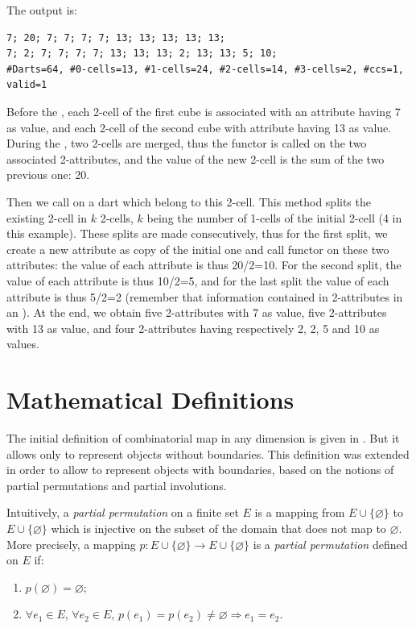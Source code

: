 The output is:
\begin{verbatim}
7; 20; 7; 7; 7; 7; 13; 13; 13; 13; 13; 
7; 2; 7; 7; 7; 7; 13; 13; 13; 2; 13; 13; 5; 10; 
#Darts=64, #0-cells=13, #1-cells=24, #2-cells=14, #3-cells=2, #ccs=1, valid=1
\end{verbatim}

Before the , each 2-cell of the first cube is
associated with an attribute having 7 as value, and each 2-cell of the
second cube with attribute having 13 as value. During the
, two 2-cells are merged, thus the functor
 is called on the two associated 2-attributes, and
the value of the new 2-cell is the sum of the two previous one: 20.

Then we call  on a dart which
belong to this 2-cell. This method splits the existing 2-cell in $k$
2-cells, $k$ being the number of 1-cells of the initial 2-cell (4 in
this example). These splits are made consecutively, thus for the first
split, we create a new attribute as copy of the initial one and call
functor  on these two attributes: the value
of each attribute is thus 20/2=10. For the second split, the value of
each attribute is thus 10/2=5, and for the last split the value of
each attribute is thus 5/2=2 (remember that information contained in
2-attributes in an ).  At the end, we obtain five
2-attributes with 7 as value, five 2-attributes with 13 as value, and
four 2-attributes having respectively 2, 2, 5 and 10 as values.

\section{Mathematical Definitions}\label{sec_definition}
The initial definition of combinatorial map in any dimension is given
in \cite{Lienhardt91,l-ndgcm-94}. But it allows only to represent
objects without boundaries. This definition was extended
\cite{PoudretAl2007,Damiand2010} in order to allow to represent objects with
boundaries, based on the notions of partial permutations and partial
involutions.

Intuitively, a \emph{partial permutation} on a finite set $E$ is a
mapping from $E\cup\{\varnothing\}$ to $E\cup\{\varnothing\}$ which is
injective on the subset of the domain that does not map to
$\varnothing$.  More precisely, a mapping $p:E \cup \{\varnothing\}
\rightarrow E \cup \{\varnothing\}$ is a \emph{partial permutation}
defined on $E$ if:
\begin{enumerate}
\item $p(\varnothing)=\varnothing$;
\item $\forall e_1 \in E$, $\forall e_2 \in E$,
  $p(e_1)=p(e_2)\neq \varnothing \Rightarrow e_1=e_2$.
\end{enumerate}

